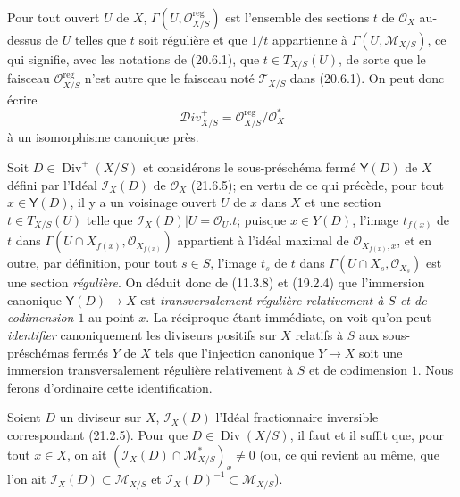 Pour tout ouvert $U$ de $X$, $\Gamma(U,\mathcal O_{X/S}^{\mathrm{reg}})$ est
l'ensemble des sections $t$ de $\mathcal O_X$ au-dessus de $U$ telles que $t$ soit
régulière et que $1/t$ appartienne à $\Gamma(U,\mathscr M_{X/S})$, ce qui signifie,
avec les notations de (20.6.1), que $t\in T_{X/S}(U)$, de sorte que le faisceau
$\mathcal O_{X/S}^{\mathrm{reg}}$ n'est autre que le faisceau noté $\mathscr T_{X/S}$
dans (20.6.1). On peut donc écrire
\[
\label{IV.21.15.3.2}
  \mathscr{D}iv_{X/S}^+=\mathcal O_{X/S}^{\mathrm{reg}}/\mathcal O_X^*
  \tag{21.15.3.2}
\]
à un isomorphisme canonique près.

\begin{env}[21.15.3.3]
\label{IV.21.15.3.3}
Soit $D\in\operatorname{Div}^+(X/S)$ et considérons le sous-préschéma fermé $\boldsymbol{\mathsf{Y}}(D)$
de $X$ défini par l'Idéal $\mathscr I_X(D)$ de $\mathcal O_X$ (21.6.5); en vertu de
ce qui précède, pour tout $x\in\boldsymbol{\mathsf{Y}}(D)$, il y a un voisinage ouvert $U$ de $x$ dans $X$
et une section $t\in T_{X/S}(U)$ telle que
$\mathscr I_X(D)|U=\mathcal O_U.t$; puisque $x\in Y(D)$, l'image $t_{f(x)}$ de
$t$ dans $\Gamma(U\cap X_{f(x)},\mathcal O_{X_{f(x)}})$ appartient à l'idéal maximal
de $\mathcal O_{X_{f(x)},x}$, et en outre, par définition, pour tout $s\in S$, l'image
$t_s$ de $t$ dans $\Gamma(U\cap X_s,\mathcal O_{X_s})$ est une section
\emph{régulière}. On déduit donc de (11.3.8) et (19.2.4) que l'immersion canonique
$\boldsymbol{\mathsf{Y}}(D)\to X$ est \emph{transversalement régulière relativement à $S$ et de
codimension $1$} au point $x$. La réciproque étant immédiate, on voit qu'on peut
\emph{identifier} canoniquement les diviseurs positifs sur $X$ relatifs à $S$ aux
sous-préschémas fermés $Y$ de $X$ tels que l'injection canonique $Y\to X$ soit une
immersion transversalement régulière relativement à $S$ et de codimension $1$. Nous
ferons d'ordinaire cette identification.
\end{env}

\begin{proposition}[21.15.4]
\label{IV.21.15.4}
Soient $D$ un diviseur sur $X$, $\mathscr I_X(D)$ l'Idéal fractionnaire inversible
correspondant \textup{(21.2.5)}. Pour que $D\in\operatorname{Div}(X/S)$, il faut et il suffit
que, pour tout $x\in X$, on ait
$(\mathscr I_X(D)\cap\mathscr M_{X/S}^*)_x\ne0$ \textup{(}ou, ce qui revient au même, que
l'on ait $\mathscr I_X(D)\subset\mathscr M_{X/S}$ et
$\mathscr I_X(D)^{-1}\subset\mathscr M_{X/S}$\textup{)}.
\end{proposition}


